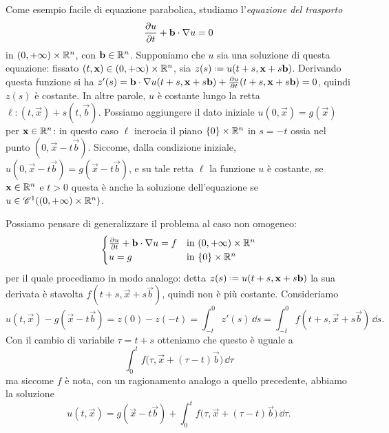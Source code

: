 \begin{esempio} \label{es:equazione-trasporto}
    Come esempio facile di equazione parabolica, studiamo l'\emph{equazione del trasporto}
    \begin{equation}
        \drp{u}{t}+\scalar{\vec b}{\grad u}=0
        \label{eq:trasporto}
    \end{equation}
    in $(0,+\infty)\times\R^n$, con $\vec b\in\R^n$. 
    Supponiamo che $u$ sia una soluzione di questa equazione: fissato $(t,\vec x)\in(0,+\infty)\times\R^n$, sia $z(s)\defeq u(t+s,\vec x+s\vec b)$.
    Derivando questa funzione si ha $z'(s)=\scalar{\vec b}{\grad u(t+s,\vec x+s\vec b)}+\drp{u}{t}(t+s,\vec x+s\vec b)=0$, quindi $z(s)$ è costante.
    In altre parole, $u$ è costante lungo la retta $\ell\colon(t,\vec x)+s(t,\vec b)$.
    Possiamo aggiungere il dato iniziale $u(0,\vec x)=g(\vec x)$ per $\vec x\in\R^n$: in questo caso $\ell$ incrocia il piano $\{0\}\times\R^n$ in $s=-t$ ossia nel punto $(0,\vec x-t\vec b)$.
    Siccome, dalla condizione iniziale, $u(0,\vec x-t\vec b)=g(\vec x-t\vec b)$, e su tale retta $\ell$ la funzione $u$ è costante, se $\vec x\in\R^n$ e $t>0$ questa è anche la soluzione dell'equazione se $u\in\cont[1]{(0,+\infty)\times\R^n}$.

    Possiamo pensare di generalizzare il problema al caso non omogeneo:
    \begin{equation}
        \begin{cases}
            \drp{u}{t}+\scalar{\vec b}{\grad u}=f & \text{in }(0,+\infty)\times\R^n\\
            u=g                                   & \text{in }\{0\}\times\R^n
        \end{cases}
        \label{eq:trasporto-non-omogeneo}
    \end{equation}
    per il quale procediamo in modo analogo: detta $z(s)\defeq u(t+s,\vec x+s\vec b)$ la sua derivata è stavolta $f(t+s,\vec x+s\vec b)$, quindi non è più costante.
    Consideriamo
    \begin{equation}
        u(t,\vec x)-g(\vec x-t\vec b)=
        z(0)-z(-t)=
        \int_{-t}^0z'(s)\,\dd s=
        \int_{-t}^0f(t+s,\vec x+s\vec b)\,\dd s.
    \end{equation}
    Con il cambio di variabile $\tau=t+s$ otteniamo che questo è uguale a
    \begin{equation}
        \int_0^tf\bigl(\tau,\vec x+(\tau-t)\vec b\bigr)\,\dd\tau
    \end{equation}
    ma siccome $f$ è nota, con un ragionamento analogo a quello precedente, abbiamo la soluzione
    \begin{equation}
        u(t,\vec x)=g(\vec x-t\vec b)+\int_0^tf\bigl(\tau,\vec x+(\tau-t)\vec b\bigr)\,\dd\tau.
    \end{equation}
\end{esempio}
